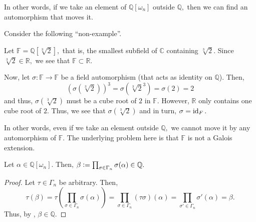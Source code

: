 In other words, if we take an element of $\mathbb{Q}[\omega_n]$ outside $\mathbb{Q},$ then we can find an automorphism that moves it.

\begin{ex}
	Consider the following ``non-example''. 

	Let $\mathbb{F} = \mathbb{Q}[\sqrt[3]{2}],$ that is, the smallest subfield of $\mathbb{C}$ containing $\sqrt[3]{2}.$ Since $\sqrt[3]{2} \in \mathbb{R},$ we see that $\mathbb{F} \subset \mathbb{R}.$

	Now, let $\sigma : \mathbb{F} \to \mathbb{F}$ be a field automorphism (that acts as identity on $\mathbb{Q}$). Then,
	\begin{equation*} 
		\left(\sigma(\sqrt[3]{2})\right)^3 = \sigma\left(\sqrt[3]{2}^3\right) = \sigma(2) = 2
	\end{equation*}
	and thus, $\sigma(\sqrt[3]{2})$ must be a cube root of $2$ in $\mathbb{F}.$ However, $\mathbb{R}$ only contains one cube root of $2.$ Thus, we see that $\sigma(\sqrt[3]{2})$ and in turn, $\sigma = \operatorname{id}_F.$

	In other words, even if we take an element outside $\mathbb{Q},$ we cannot move it by any automorphism of $\mathbb{F}.$ The underlying problem here is that $\mathbb{F}$ is not a Galois extension.
\end{ex}

\begin{cor} \label{cor:averagingisrational}
	Let $\alpha \in \mathbb{Q}[\omega_n].$ Then, $\beta \vcentcolon= \prod_{\sigma \in \Gamma_n} \sigma(\alpha) \in \mathbb{Q}.$
\end{cor}
\begin{proof} 
	Let $\tau \in \Gamma_n$ be arbitrary. Then,
	\begin{equation*} 
		\tau(\beta) = \tau\left(\prod_{\sigma \in \Gamma_n} \sigma(\alpha)\right) = \prod_{\sigma \in \Gamma_n} (\tau\sigma)(\alpha) = \prod_{\sigma' \in \Gamma_n} \sigma'(\alpha) = \beta.
	\end{equation*}
	Thus, by , $\beta \in \mathbb{Q}.$
\end{proof}

